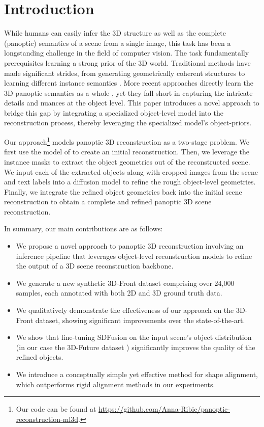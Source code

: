 \section{Introduction}
\label{sec:intro}


While humans can easily infer the 3D structure as well as the complete (panoptic) semantics of a scene from a single image, this task has been a longstanding
challenge in the field of computer vision. The task fundamentally prerequisites learning a strong prior of the 3D world. Traditional methods have made significant strides,
from generating geometrically coherent structures \citep{denninger20203d, shin20193d} to learning different instance semantics \citep{gkioxari2019mesh, kuo2020mask2cad,
nie2020total3dunderstanding}. More recent approaches directly learn the 3D panoptic semantics as a whole \citep{dahnert2021panoptic, zhang2023uni}, yet they fall short in capturing the intricate details and nuances at the object level.
This paper introduces a novel approach to bridge this gap by integrating a specialized object-level model into the reconstruction process, thereby leveraging the specialized model's object-priors.

Our approach\footnote{Our code can be found at \url{https://github.com/Anna-Ribic/panoptic-reconstruction-ml3d}.} models panoptic 3D reconstruction as a two-stage problem. We first use the model of \citet{dahnert2021panoptic} to create an initial reconstruction. Then, we leverage the instance masks to extract the object geometries out of the reconstructed scene. We input each of the extracted objects along with cropped images from the scene and text labels into a diffusion model \citep{cheng2023sdfusion} to refine the rough object-level geometries.
Finally, we integrate the refined object geometries back into the initial scene reconstruction to obtain a complete and refined panoptic 3D scene reconstruction.

In summary, our main contributions are as follows:
\begin{itemize}
    \item We propose a novel approach to panoptic 3D reconstruction involving an inference pipeline that leverages object-level reconstruction models to refine the output of a 3D scene reconstruction backbone.
    \item We generate a new synthetic 3D-Front \citep{fu20213d} dataset comprising over 24,000 samples, each annotated with both 2D and 3D ground truth data.
    \item We qualitatively demonstrate the effectiveness of our approach on the 3D-Front \citep{fu20213d} dataset, showing significant improvements over the state-of-the-art.
    \item We show that fine-tuning SDFusion \citep{cheng2023sdfusion} on the input scene's object distribution (in our case the 3D-Future dataset \citep{fu20213e}) significantly improves the quality of the refined objects.
    \item We introduce a conceptually simple yet effective method for shape alignment, which outperforms rigid alignment methods in our experiments.
\end{itemize}
